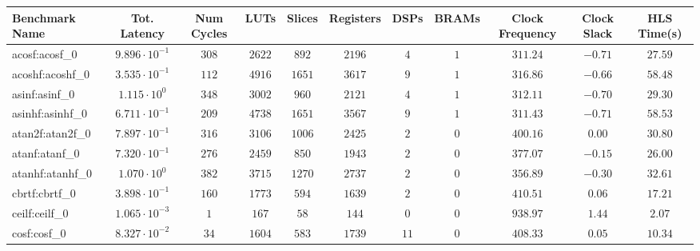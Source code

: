 \begin{tabular}{|l|c|c|c|c|c|c|c|c|c|c|}
\hline
Benchmark Name               & Tot. Latency            & Num Cycles & LUTs      & Slices    & Registers & DSPs    & BRAMs & Clock Frequency & Clock Slack & HLS Time(s) \\
\hline
acosf:acosf\_0               & $ 9.896 \cdot 10^{-1} $ & $ 308    $ & $ 2622  $ & $ 892   $ & $ 2196  $ & $ 4   $ & $ 1 $ & $ 311.24      $ & $ -0.71   $ & $ 27.59   $ \\
acoshf:acoshf\_0             & $ 3.535 \cdot 10^{-1} $ & $ 112    $ & $ 4916  $ & $ 1651  $ & $ 3617  $ & $ 9   $ & $ 1 $ & $ 316.86      $ & $ -0.66   $ & $ 58.48   $ \\
asinf:asinf\_0               & $ 1.115 \cdot 10^{0}  $ & $ 348    $ & $ 3002  $ & $ 960   $ & $ 2121  $ & $ 4   $ & $ 1 $ & $ 312.11      $ & $ -0.70   $ & $ 29.30   $ \\
asinhf:asinhf\_0             & $ 6.711 \cdot 10^{-1} $ & $ 209    $ & $ 4738  $ & $ 1651  $ & $ 3567  $ & $ 9   $ & $ 1 $ & $ 311.43      $ & $ -0.71   $ & $ 58.53   $ \\
atan2f:atan2f\_0             & $ 7.897 \cdot 10^{-1} $ & $ 316    $ & $ 3106  $ & $ 1006  $ & $ 2425  $ & $ 2   $ & $ 0 $ & $ 400.16      $ & $ 0.00    $ & $ 30.80   $ \\
atanf:atanf\_0               & $ 7.320 \cdot 10^{-1} $ & $ 276    $ & $ 2459  $ & $ 850   $ & $ 1943  $ & $ 2   $ & $ 0 $ & $ 377.07      $ & $ -0.15   $ & $ 26.00   $ \\
atanhf:atanhf\_0             & $ 1.070 \cdot 10^{0}  $ & $ 382    $ & $ 3715  $ & $ 1270  $ & $ 2737  $ & $ 2   $ & $ 0 $ & $ 356.89      $ & $ -0.30   $ & $ 32.61   $ \\
cbrtf:cbrtf\_0               & $ 3.898 \cdot 10^{-1} $ & $ 160    $ & $ 1773  $ & $ 594   $ & $ 1639  $ & $ 2   $ & $ 0 $ & $ 410.51      $ & $ 0.06    $ & $ 17.21   $ \\
ceilf:ceilf\_0               & $ 1.065 \cdot 10^{-3} $ & $ 1      $ & $ 167   $ & $ 58    $ & $ 144   $ & $ 0   $ & $ 0 $ & $ 938.97      $ & $ 1.44    $ & $ 2.07    $ \\
cosf:cosf\_0                 & $ 8.327 \cdot 10^{-2} $ & $ 34     $ & $ 1604  $ & $ 583   $ & $ 1739  $ & $ 11  $ & $ 0 $ & $ 408.33      $ & $ 0.05    $ & $ 10.34   $ \\

\end{tabular}
